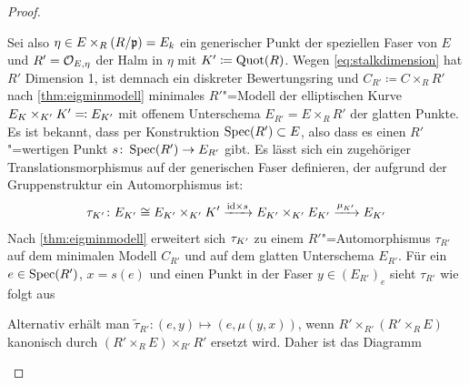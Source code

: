 \begin{Lemma}
\begin{proof}
\begin{description}
      Sei also $\eta\in E\times_R (R/\mathfrak{p})=E_k$ ein generischer Punkt der
      speziellen Faser von $E$ und ${R'=\mathcal{O}_{E,\eta}}$ der Halm in
      $\eta$ mit $K'\coloneqq\operatorname{Quot}(R)$.
      Wegen \autoref{eq:stalkdimension} hat $R'$
      Dimension 1, ist demnach ein diskreter Bewertungsring und
      $C_{R'}\coloneqq C\times_R R'$ nach \ref{thm:eigminmodell}
      minimales $R'$"=Modell der elliptischen Kurve
      $E_{K}\times_{K'}K'\eqqcolon E_{K'}$ mit offenem Unterschema
      ${E_{R'}=E\times_R R'}$ der glatten Punkte.
      Es ist bekannt, dass per Konstruktion $\operatorname{Spec}(R')\subset E$, also dass
      es einen $R'$"=wertigen Punkt $s\colon\operatorname{Spec}(R')\to E_{R'}$ gibt.
      Es lässt sich ein zugehöriger Translationsmorphismus auf der
      generischen Faser definieren, der aufgrund der Gruppenstruktur
      ein Automorphismus ist:
      \begin{gather*}
        \tau_{K'}\colon
        E_{K'}\cong E_{K'}\times_{K'}K'
        \xrightarrow{\mathrm{id}\times s}
        E_{K'}\times_{K'}E_{K'}
        \xrightarrow{\mu_{K'}}
        E_{K'}
      \end{gather*}
      Nach \ref{thm:eigminmodell} erweitert sich $\tau_{K'}$ zu
      einem $R'$"=Automorphismus $\tau_{R'}$ auf dem minimalen Modell
      $C_{R'}$ und auf dem glatten Unterschema $E_{R'}$.
      Für ein $e\in\operatorname{Spec}(R')$, $x=s(e)$ und einen Punkt in der Faser
      $y\in(E_{R'})_e$ sieht $\tau_{R'}$ wie folgt aus
      \begin{center}
      \end{center}
      Alternativ erhält man
      $\tilde\tau_{R'}\colon(e,y)\mapsto(e,\mu(y,x))$, wenn
      $R'\times_{R'}(R'\times_R E)$ kanonisch durch
      ${(R'\times_R E)\times_{R'}R'}$ ersetzt wird.
      Daher ist das Diagramm
      \begin{center}
\end{center}
\end{description}
\end{proof}
\end{Lemma}
